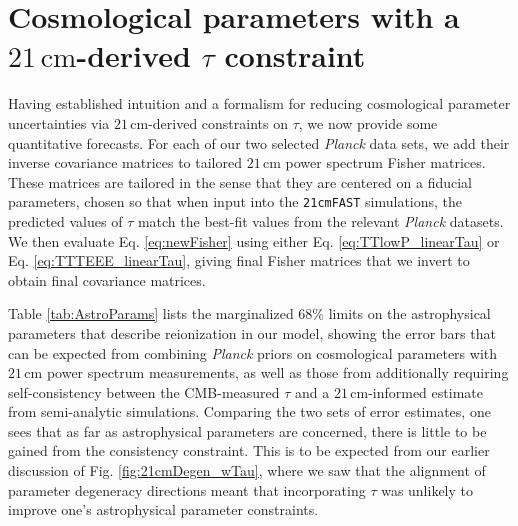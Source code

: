 \documentclass[twocolumn,aps,prd,nofootinbib,showpacs]{revtex4-1}
\begin{document}
\section{Cosmological parameters with a $21\,\textrm{cm}$-derived $\tau$ constraint}
\label{sec:CMBresults}

Having established intuition and a formalism for reducing cosmological parameter uncertainties via $21\,\textrm{cm}$-derived constraints on $\tau$, we now provide some quantitative forecasts. For each of our two selected \emph{Planck} data sets, we add their inverse covariance matrices to tailored $21\,\textrm{cm}$ power spectrum Fisher matrices. These matrices are tailored in the sense that they are centered on a fiducial parameters, chosen so that when input into the {\tt 21cmFAST} simulations, the predicted values of $\tau$ match the best-fit values from the relevant \emph{Planck} datasets. We then evaluate Eq. \eqref{eq:newFisher} using either Eq. \eqref{eq:TTlowP_linearTau} or Eq. \eqref{eq:TTTEEE_linearTau}, giving final Fisher matrices that we invert to obtain final covariance matrices.

Table \ref{tab:AstroParams} lists the marginalized $68\%$ limits on the astrophysical parameters that describe reionization in our model, showing the error bars that can be expected from combining \emph{Planck} priors on cosmological parameters with $21\,\textrm{cm}$ power spectrum measurements, as well as those from additionally requiring self-consistency between the CMB-measured $\tau$ and a $21\,\textrm{cm}$-informed estimate from semi-analytic simulations. Comparing the two sets of error estimates, one sees that as far as astrophysical parameters are concerned, there is little to be gained from the consistency constraint. This is to be expected from our earlier discussion of Fig. \ref{fig:21cmDegen_wTau}, where we saw that the alignment of parameter degeneracy directions meant that incorporating $\tau$ was unlikely to improve one's astrophysical parameter constraints.
\end{document}
